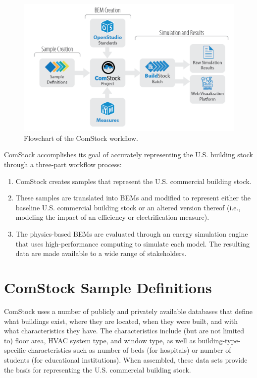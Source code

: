 \begin{figure}[h!]
  \centering
  \includegraphics[width=\textwidth]{figures/comstock_workflow.png}
  \caption[Flowchart of the ComStock workflow]{Flowchart of the ComStock workflow.}
  \label{fig:comstock_workflow}
\end{figure}

\pagebreak

ComStock accomplishes its goal of accurately representing the U.S. building stock through a three-part workflow process: \begin{enumerate}
    \item ComStock creates samples that represent the U.S. commercial building stock.
    \item These samples are translated into BEMs and modified to represent either the baseline U.S. commercial building stock or an altered version thereof (i.e., modeling the impact of an efficiency or electrification measure).
    \item The physics-based BEMs are evaluated through an energy simulation engine that uses high-performance computing to simulate each model. The resulting data are made available to a wide range of stakeholders.
\end{enumerate}

\section{ComStock Sample Definitions}
\label{sec:sample_definitions}

ComStock uses a number of publicly and privately available databases that define what buildings exist, where they are located, when they were built, and with what characteristics they have. The characteristics include (but are not limited to) floor area, HVAC system type, and window type, as well as building-type-specific characteristics such as number of beds (for hospitals) or number of students (for educational institutions). When assembled, these data sets provide the basis for representing the U.S. commercial building stock.

